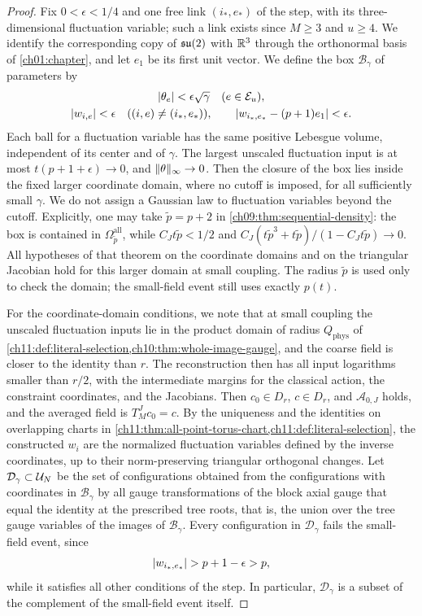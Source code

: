 \begin{proof}
Fix $0<\epsilon<1/4$ and one free link $(i_*,e_*)$ of the step, with its three-dimensional fluctuation variable; such a link exists since $M\ge3$ and $u\ge4$. We identify the corresponding copy of $\mathfrak{su}(2)$ with $\mathbb R^3$ through the orthonormal basis of \cref{ch01:chapter}, and let $e_1$ be its first unit vector. We define the box $\mathcal B_\gamma$ of parameters by
\begin{equation}\label{ch20:eq:rejection-local-box}
 \begin{gathered}
 \lvert \theta_e\rvert<\epsilon\sqrt\gamma\quad(e\in\mathcal E_{u}),\\
 \lvert w_{i,e}\rvert<\epsilon\quad((i,e)\ne(i_*,e_*)),\qquad
 \lvert w_{i_*,e_*}-(p+1)e_1\rvert<\epsilon.
 \end{gathered}
\end{equation}
Each ball for a fluctuation variable has the same positive Lebesgue volume, independent of its center and of $\gamma$. The largest unscaled fluctuation input is at most $t(p+1+\epsilon)\to0$, and $\lVert \theta\rVert_\infty\to0$. Then the closure of the box lies inside the fixed larger coordinate domain, where no cutoff is imposed, for all sufficiently small $\gamma$. We do not assign a Gaussian law to fluctuation variables beyond the cutoff. Explicitly, one may take $\widetilde p=p+2$ in \cref{ch09:thm:sequential-density}: the box is contained in $\Omega^{\mathrm{all}}_{\widetilde p}$, while $C_Jt\widetilde p<1/2$ and $C_J(t\widetilde p^3+t\widetilde p)/(1-C_Jt\widetilde p)\to0$. All hypotheses of that theorem on the coordinate domains and on the triangular Jacobian hold for this larger domain at small coupling. The radius $\widetilde p$ is used only to check the domain; the small-field event still uses exactly $p(t)$.

For the coordinate-domain conditions, we note that at small coupling the unscaled fluctuation inputs lie in the product domain of radius $Q_{\mathrm{phys}}$ of \cref{ch11:def:literal-selection,ch10:thm:whole-image-gauge}, and the coarse field is closer to the identity than $r$. The reconstruction then has all input logarithms smaller than $r/2$, with the intermediate margins for the classical action, the constraint coordinates, and the Jacobians. Then $c_0\in D_r$, $c\in D_r$, and $\mathcal A_{0,J}$ holds, and the averaged field is $T_M^Jc_0=c$. By the uniqueness and the identities on overlapping charts in \cref{ch11:thm:all-point-torus-chart,ch11:def:literal-selection}, the constructed $w_i$ are the normalized fluctuation variables defined by the inverse coordinates, up to their norm-preserving triangular orthogonal changes. Let $\mathcal D_\gamma\subset\mathcal U_{N}$ be the set of configurations obtained from the configurations with coordinates in $\mathcal B_\gamma$ by all gauge transformations of the block axial gauge that equal the identity at the prescribed tree roots, that is, the union over the tree gauge variables of the images of $\mathcal B_\gamma$. Every configuration in $\mathcal D_\gamma$ fails the small-field event, since
\[
 \lvert w_{i_*,e_*}\rvert>p+1-\epsilon>p,
\]
while it satisfies all other conditions of the step. In particular, $\mathcal D_\gamma$ is a subset of the complement of the small-field event itself.


\end{proof}
